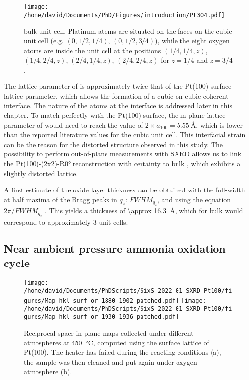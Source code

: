 \begin{SCfigure}
    \centering
    \texttt{[image: /home/david/Documents/PhD/Figures/introduction/Pt3O4.pdf]}
    \caption{
         bulk unit cell.
        Platinum atoms are situated on the faces on the cubic unit cell (e.g. $(0, 1/2, 1/4)$, $(0, 1/2, 3/4)$), while the eight oxygen atoms are inside the unit cell at the positions $(1/4, 1/4, z)$, $(1/4, 2/4, z)$, $(2/4, 1/4, z)$, $(2/4, 2/4, z)$ for $z=1/4$ and $z=3/4$.
    }
    \label{fig:Pt3O4}
\end{SCfigure}

The lattice parameter of  is approximately twice that of the Pt(100) surface lattice parameter, which allows the formation of a cubic on cubic coherent interface.
The nature of the atoms at the interface is addressed later in this chapter.
To match perfectly with the Pt(100) surface, the in-plane lattice parameter of  would need to reach the value of $2\times a_{100} =\qty{5.55}{\angstrom}$, which is lower than the reported literature values for the cubic unit cell.
This interfacial strain can be the reason for the distorted structure observed in this study.
The possibility to perform out-of-plane measurements with SXRD allows us to link the Pt(100)-(2x2)-R\ang{0} reconstruction with certainty to bulk , which exhibits a slightly distorted lattice.

A first estimate of the oxide layer thickness can be obtained with the full-width at half maxima of the Bragg peaks in $q_z$: $FWHM_{q_z}$, and using the equation $2\pi/FWHM_{q_z}$ \parencite{Patterson1939, Warren1990}.
This yields a thickness of \qty{\approx 16.3}{\angstrom}, which for bulk  would correspond to approximately \num{3} unit cells.

\subsection{Near ambient pressure ammonia oxidation cycle}

\begin{figure}[!htb]
    \centering
    \texttt{[image: /home/david/Documents/PhDScripts/SixS\_2022\_01\_SXRD\_Pt100/figures/Map\_hkl\_surf\_or\_1880-1902\_patched.pdf]}
    \texttt{[image: /home/david/Documents/PhDScripts/SixS\_2022\_01\_SXRD\_Pt100/figures/Map\_hkl\_surf\_or\_1930-1936\_patched.pdf]}
    \caption{
        Reciprocal space in-plane maps collected under different atmospheres at \qty{450}{\degreeCelsius}, computed using the surface lattice of Pt(100).
        The heater has failed during the reacting conditions (a), the sample was then cleaned and put again under oxygen atmosphere (b).
    }
    \label{fig:MapsPt100B}
\end{figure}

